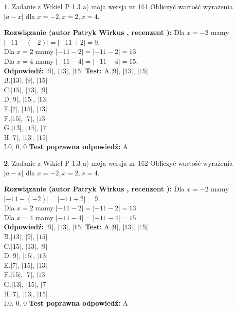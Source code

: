 \documentclass[12pt, a4paper]{article}
\theoremstyle{definition} %
\newtheorem{zad}{}
\newcommand{\zadStart}[1]{\begin{zad}#1\newline}
\newcommand{\zadStop}{\end{zad}}
\newcommand{\rozwStart}[2]{\noindent \textbf{Rozwiązanie (autor #1 , recenzent #2): }\newline}
\newcommand{\rozwStop}{\newline}
\newcommand{\odpStart}{\noindent \textbf{Odpowiedź:}\newline}
\newcommand{\odpStop}{\newline}
\newcommand{\testStart}{\noindent \textbf{Test:}\newline}
\newcommand{\testStop}{\newline}
\newcommand{\kluczStart}{\noindent \textbf{Test poprawna odpowiedź:}\newline}
\newcommand{\kluczStop}{\newline}
\begin{document}
\zadStart{Zadanie z Wikieł P 1.3 a) moja wersja nr 161}
Obliczyć wartość wyrażenia $|a - x|$ dla $x=-2,x=2,x=4$.
\zadStop
\rozwStart{Patryk Wirkus}{}
Dla $x = -2$ mamy $|-11 - (-2)| = |-11 + 2| = 9$.\\
Dla $x = 2$ mamy $|-11 - 2| = |-11 - 2| = 13$.\\
Dla $x = 4$ mamy $|-11 - 4| = |-11 - 4| = 15$.\\
\rozwStop
\odpStart
$|9|$, $|13|$, $|15|$
\odpStop
\testStart
A.$|9|$, $|13|$, $|15|$\\
B.$|13|$, $|9|$, $|15|$\\
C.$|15|$, $|13|$, $|9|$\\
D.$|9|$, $|15|$, $|13|$\\
E.$|7|$, $|15|$, $|13|$\\
F.$|15|$, $|7|$, $|13|$\\
G.$|13|$, $|15|$, $|7|$\\
H.$|7|$, $|13|$, $|15|$\\
I.$0$, $0$, $0$
\testStop
\kluczStart
A
\kluczStop



\zadStart{Zadanie z Wikieł P 1.3 a) moja wersja nr 162}
Obliczyć wartość wyrażenia $|a - x|$ dla $x=-2,x=2,x=4$.
\zadStop
\rozwStart{Patryk Wirkus}{}
Dla $x = -2$ mamy $|-11 - (-2)| = |-11 + 2| = 9$.\\
Dla $x = 2$ mamy $|-11 - 2| = |-11 - 2| = 13$.\\
Dla $x = 4$ mamy $|-11 - 4| = |-11 - 4| = 15$.\\
\rozwStop
\odpStart
$|9|$, $|13|$, $|15|$
\odpStop
\testStart
A.$|9|$, $|13|$, $|15|$\\
B.$|13|$, $|9|$, $|15|$\\
C.$|15|$, $|13|$, $|9|$\\
D.$|9|$, $|15|$, $|13|$\\
E.$|7|$, $|15|$, $|13|$\\
F.$|15|$, $|7|$, $|13|$\\
G.$|13|$, $|15|$, $|7|$\\
H.$|7|$, $|13|$, $|15|$\\
I.$0$, $0$, $0$
\testStop
\kluczStart
A
\kluczStop
\end{document}
